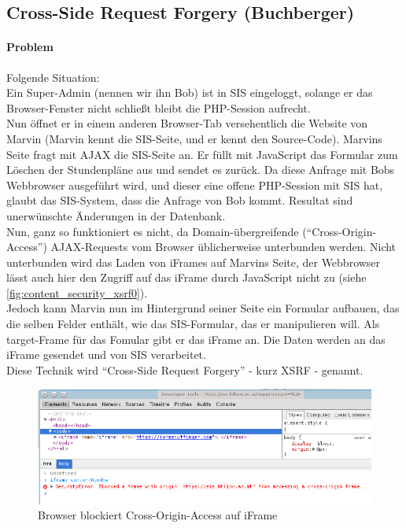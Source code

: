 \subsection{Cross-Side Request Forgery (Buchberger)}
\label{sec:content_security_xsrf}
\paragraph{Problem}
Folgende Situation:\\
Ein Super-Admin (nennen wir ihn Bob) ist in SIS eingeloggt, solange er das Browser-Fenster nicht schließt bleibt die PHP-Session aufrecht. \\
Nun öffnet er in einem anderen Browser-Tab versehentlich die Website von Marvin (Marvin kennt die SIS-Seite, und er kennt den Source-Code). Marvins Seite fragt mit AJAX die SIS-Seite an. Er füllt mit JavaScript das Formular zum Löschen der Stundenpläne aus und sendet es zurück. Da diese Anfrage mit Bobs Webbrowser ausgeführt wird, und dieser eine offene PHP-Session mit SIS hat, glaubt das SIS-System, dass die Anfrage von Bob kommt. Resultat sind unerwünschte Änderungen in der Datenbank.\\
Nun, ganz so funktioniert es nicht, da Domain-übergreifende (\enquote{Cross-Origin-Access}) AJAX-Requests vom Browser üblicherweise unterbunden werden. Nicht unterbunden wird das Laden von iFrames auf Marvins Seite, der Webbrowser lässt auch hier den Zugriff auf das iFrame durch JavaScript nicht zu (siehe \autoref{fig:content_security_xsrf0}).\\
Jedoch kann Marvin nun im Hintergrund seiner Seite ein Formular aufbauen, das die selben Felder enthält, wie das SIS-Formular, das er manipulieren will. Als target-Frame für das Fomular gibt er das iFrame an. Die Daten werden an das iFrame gesendet und von SIS verarbeitet.\\
Diese Technik wird \enquote{Cross-Side Request Forgery} - kurz XSRF - genannt.

\begin{figure}[H]
\centering
\includegraphics[keepaspectratio=true, width=14cm]{images/screenshots/xsrf0.png}
\caption{Browser blockiert Cross-Origin-Access auf iFrame}
\label{fig:content_security_xsrf0}
\end{figure}

